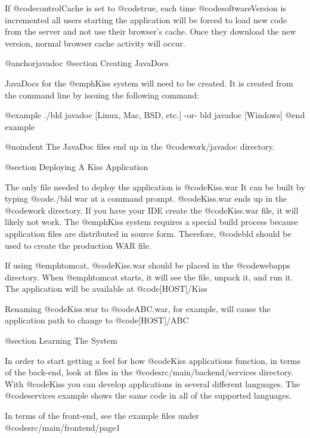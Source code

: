 If @code{controlCache} is set to @code{true}, each time @code{softwareVersion}
is incremented all users starting the application will be forced to
load new code from the server and not use their browser's cache.  Once
they download the new version, normal browser cache activity will
occur.


@anchor{javadoc} @section Creating JavaDocs

JavaDocs for the @emph{Kiss} system will need to be created.  It is
created from the command line by issuing the following command:

@example
./bld javadoc              [Linux, Mac, BSD, etc.]
    -or-
bld javadoc                [Windows]
@end example

@noindent
The JavaDoc files end up in the @code{work/javadoc} directory.


@section Deploying A Kiss Application

The only file needed to deploy the application is @code{Kiss.war} It
can be built by typing @code{./bld war} at a command prompt.
@code{Kiss.war} ends up in the @code{work} directory.  If you
have your IDE create the @code{Kiss.war} file, it will likely not
work.  The @emph{Kiss} system requires a special build process because
application files are distributed in source form.  Therefore, @code{bld}
should be used to create the production WAR file.

If using @emph{tomcat}, @code{Kiss.war} should be placed in the
@code{webapps} directory.  When @emph{tomcat} starts, it will see the
file, unpack it, and run it.  The application will be available at
@code{[HOST]/Kiss}

Renaming @code{Kiss.war} to @code{ABC.war}, for example, will cause
the application path to change to @code{[HOST]/ABC}

@section Learning The System

In order to start getting a feel for how @code{Kiss} applications
function, in terms of the back-end, look at files in the
@code{src/main/backend/services} directory.  With @code{Kiss} you can
develop applications in several different languages.  The @code{services}
example shows the same code in all of the supported languages.

In terms of the front-end, see the example files under @code{src/main/frontend/page1}
